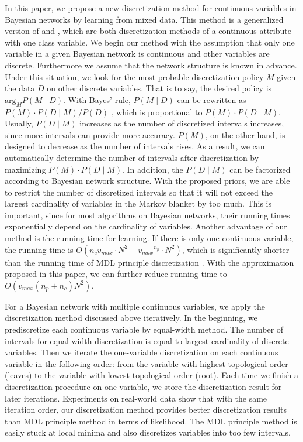 In this paper, we propose a new discretization method for continuous variables in Bayesian networks by learning from mixed data. This method is a generalized version of  \citet{Boulle_2006} and \citet{Lustgarten_2011}, which are both discretization methods of a continuous attribute with one class variable. We begin our method with the assumption that only one variable in a given Bayesian network is continuous and other variables are discrete. Furthermore we assume that the network structure is known in advance. Under this situation, we look for the most probable discretization policy $M$ given the data $D$ on other discrete variables. That is to say, the desired policy is $\textrm{arg}_M P(M \mid D)$. With Bayes' rule, $P(M \mid D) $ can be rewritten as $P(M) \cdot P(D \mid M) / P(D)$ , which is proportional to $P(M)\cdot P(D \mid M)$. Usually, $P(D \mid M)$ increases as the number of discretized intervals increases, since more intervals can provide more accuracy. $P(M)$, on the other hand, is designed to decrease as the number of intervals rises. As a result, we can automatically determine the number of intervals after discretization by maximizing  $P(M)\cdot P(D \mid M)$. In addition, the $P(D \mid M)$ can be factorized according to Bayesian network structure. With the proposed priors, we are able to restrict the number of discretized intervals so that it will not exceed the largest cardinality of variables in the Markov blanket by too much. This is important, since for most algorithms on Bayesian networks, their running times exponentially depend on the cardinality of variables. Another advantage of our method is the running time for learning. If there is only one continuous variable, the running time is $O(n_c  {v_{max}} \cdot N^2 + {v_{max}}^{n_p} \cdot N^2)$, which is significantly shorter than the running time of MDL principle discretization \citep{Friedman_1996}. With the approximation proposed in this paper, we can further reduce running time to $O({v_{max}}(n_p+n_c)N^2)$.

For a Bayesian network with multiple continuous variables, we apply the discretization method discussed above iteratively. In the beginning, we prediscretize each continuous variable by equal-width method. The number of intervals for equal-width discretization is equal to largest cardinality of discrete variables. Then we iterate the one-variable discretization on each continuous variable in the following order: from the variable with highest topological order (leaves) to the variable with lowest topological order (root). Each time we finish a discretization procedure on one variable, we store the discretization result for later iterations. Experiments on real-world data show that with the same iteration order, our discretization method provides better discretization results than MDL principle method in terms of likelihood. The MDL principle method is easily stuck at local minima and also discretizes variables into too few intervals.

